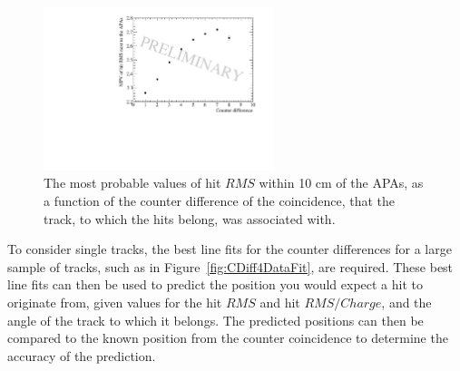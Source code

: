 \begin{figure}[h!]
  \centering
  \includegraphics[width=0.6\textwidth]{InterceptCanvasData}
  \caption[The angular dependence of diffusion in the 35 ton dataset for hits within 10 cm of the APAs]
          {The most probable values of hit $RMS$ within 10 cm of the APAs, as a function of the counter difference of the coincidence, that the track, to which the hits belong, was associated with.}
  \label{fig:DiffData_AngFit}
\end{figure}

To consider single tracks, the best line fits for the counter differences for a large sample of tracks, such as in Figure~\ref{fig:CDiff4DataFit}, are required. These best line fits can then be used to predict the position you would expect a hit to originate from, given values for the hit $RMS$ and hit $RMS/Charge$, and the angle of the track to which it belongs. The predicted positions can then be compared to the known position from the counter coincidence to determine the accuracy of the prediction. \\

